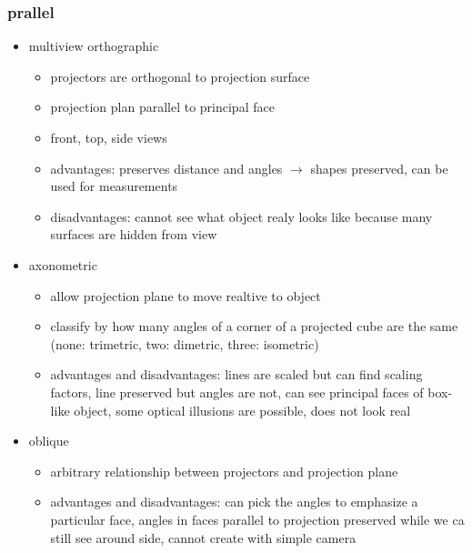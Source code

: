 \documentclass[11pt,a4paper]{article}
\begin{document}
	\subsubsection{prallel}
	\begin{itemize}
		\item multiview orthographic
		\begin{itemize}
			\item projectors are orthogonal to projection surface
			\item projection plan parallel to principal face
			\item front, top, side views
			\item advantages: preserves distance and angles $\rightarrow$ shapes preserved, can be used for measurements
			\item disadvantages: cannot see what object realy looks like because many surfaces are hidden from view
		\end{itemize}
		\item axonometric
		\begin{itemize}
			\item allow projection plane to move realtive to object
			\item classify by how many angles of a corner of a projected cube are the same (none: trimetric, two: dimetric, three: isometric)
			\item advantages and disadvantages: lines are scaled but can find scaling factors, line preserved but angles are not, can see principal faces of box-like object, some optical 				illusions are possible, does not look real
		\end{itemize}
		\item oblique
		\begin{itemize}
			\item arbitrary relationship between projectors and projection plane
			\item advantages and disadvantages: can pick the angles to emphasize a particular face, angles in faces parallel to projection preserved while we ca still see around side, 
			cannot create with simple camera
		\end{itemize}
	\end{itemize}
\end{document}
